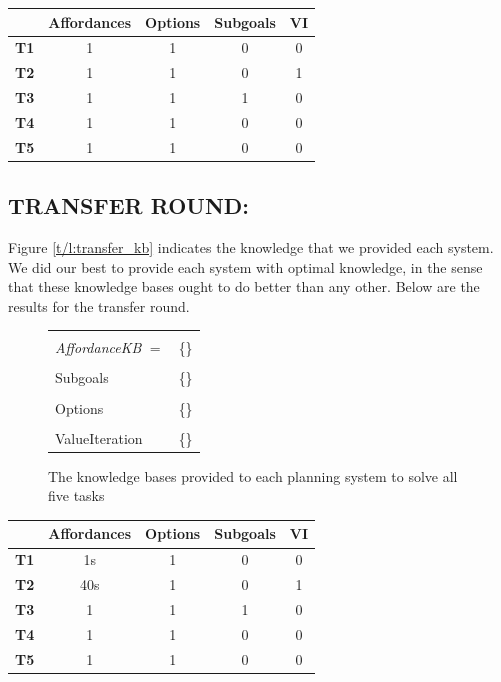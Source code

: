 \documentclass[]{article}
\begin{document}
\begin{tabular}{ l || c | c | c | c }
  & Affordances & Options & Subgoals & VI \\
  \hline
  {\bf T1} & 1 & 1 & 0 & 0  \\
  {\bf T2} & 1 & 1 & 0 & 1 \\
  {\bf T3} & 1 & 1 & 1 & 0 \\
  {\bf T4} & 1 & 1 & 0 & 0 \\
  {\bf T5} & 1 & 1 & 0 & 0 \\
\end{tabular}


\subsection{TRANSFER ROUND:}

Figure \ref{t/l:transfer_kb} indicates the knowledge that we provided each system. We did our best to provide each system with optimal knowledge, in the sense that these knowledge bases ought to do better than any other. Below are the results for the transfer round.

\begin{figure}
\centering
\begin{tabular}{| l  c |}
\hline \\
{\it AffordanceKB} $=$ & \{\} \\
\hline \\
Subgoals & \{\} \\
\hline \\
Options & \{\} \\
\hline \\
ValueIteration & \{\} \\
\hline
\end{tabular}
\caption{The knowledge bases provided to each planning system to solve all five tasks \label{tbl:transfer_kb}}
\end{figure}

\begin{tabular}{ l || c | c | c | c }
  & Affordances & Options & Subgoals & VI \\
  \hline
  {\bf T1} & 1s & 1 & 0 & 0  \\
  {\bf T2} & 40s & 1 & 0 & 1 \\
  {\bf T3} & 1 & 1 & 1 & 0 \\
  {\bf T4} & 1 & 1 & 0 & 0 \\
  {\bf T5} & 1 & 1 & 0 & 0 \\
\end{tabular}
\end{document}
